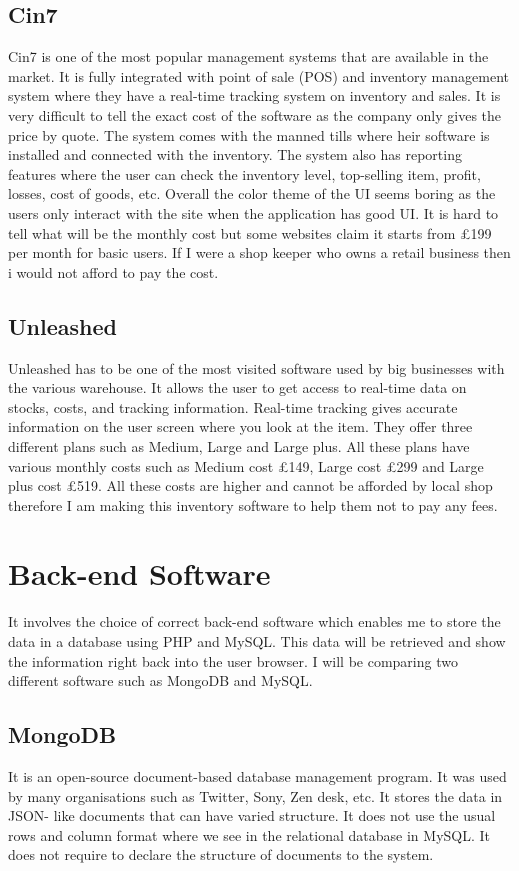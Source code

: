 \subsection{Cin7}
Cin7 is one of the most popular management systems that are available in the market. It is fully integrated with point of sale (POS) and inventory management system where they have a real-time tracking system on inventory and sales. It is very difficult to tell the exact cost of the software as the company only gives the price by quote. The system comes with the manned tills where heir software is installed and connected with the inventory. The system also has reporting features where the user can check the inventory level, top-selling item, profit, losses, cost of goods, etc. Overall the color theme of the UI seems boring as the users only interact with the site when the application has good UI. It is hard to tell what will be the monthly cost but some websites claim it starts from £199 per month for basic users. If I were a shop keeper who owns a retail business then i would not afford to pay the cost.

\subsection{Unleashed}
Unleashed has to be one of the most visited software used by big businesses with the various warehouse. It allows the user to get access to real-time data on stocks, costs, and tracking information. Real-time tracking gives accurate information on the user screen where you look at the item. They offer three different plans such as Medium, Large and Large plus. All these plans have various monthly costs such as Medium cost £149, Large cost £299 and Large plus cost £519. All these costs are higher and cannot be afforded by local shop therefore I am making this inventory software to help them not to pay any fees.    

\section{Back-end Software}
It involves the choice of correct back-end software which enables me to store the data in a database using PHP and MySQL. This data will be retrieved and show the information right back into the user browser. I will be comparing two different software such as MongoDB and MySQL.

\subsection{MongoDB}
It is an open-source document-based database management program. It was used by many organisations such as Twitter, Sony, Zen desk, etc. It stores the data in JSON- like documents that can have varied structure. It does not use the usual rows and column format where we see in the relational database in MySQL. It does not require to declare the structure of documents to the system. 

